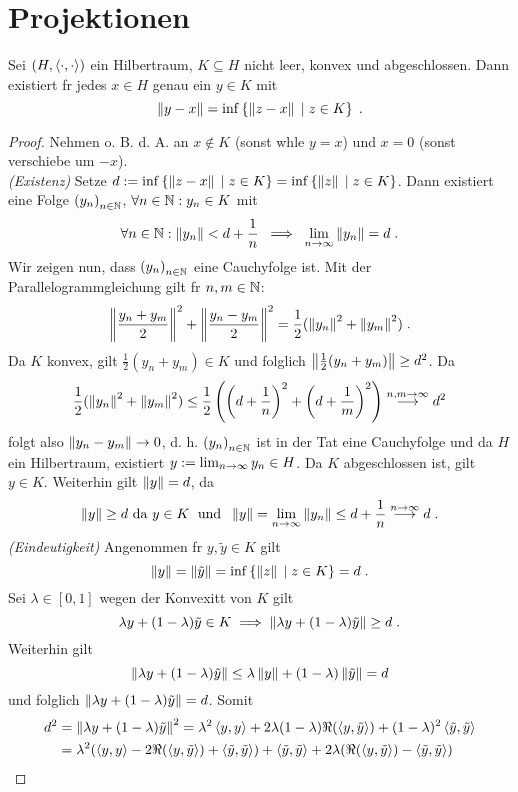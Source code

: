\section{Projektionen}
\begin{theorem}
	Sei \((H, \left\langle\cdot, \cdot\right\rangle)\) ein Hilbertraum, \(K \subseteq H\) nicht leer, konvex und abgeschlossen. Dann existiert f\us r jedes \(x \in H \) genau ein \(y \in K\) mit 
	\[\left\lVert y-x\right\rVert = \inf\left\{ \left\lVert z-x\right\rVert\;\vert\; z \in K\right\} \;.\]
	\label{Projektionssatz}
\end{theorem}
\begin{proof}
	Nehmen o. B. d. A. an \(x\not\in K\) (sonst w\as hle \(y = x\)) und \(x = 0\) (sonst verschiebe um \(-x\)).\\
	\textit{(Existenz)} Setze \(d:= \inf\left\{\left\lVert z-x\right\rVert \;\vert\; z\in K\right\} = \inf\left\{\left\lVert z\right\rVert\;\vert\; z\in K\right\} \). Dann existiert eine Folge \(\left (y_n\right )_{n\in \mathbb{N}}\), \(\forall n \in \mathbb{N}: y_n \in K\) mit
	\[\forall n \in \mathbb{N}: \left\lVert y_n\right\rVert < d + \frac{1}{n} \;\implies\; \lim_{n \to\infty} \left\lVert y_n\right\rVert = d\;.\]
	Wir zeigen nun, dass \(\left (y_n\right )_{n\in \mathbb{N}}\) eine Cauchyfolge ist. Mit der Parallelogrammgleichung gilt f\us r \(n,m\in\mathbb{N}\):
	\[\left\lVert\frac{y_n + y_m}{2}\right\rVert^2 + \left\lVert\frac{y_n - y_m}{2}\right\rVert^2 = \frac{1}{2} (\left\lVert y_n\right\rVert^2 + \left\lVert y_m\right\rVert^2)\;.\]
	Da \(K\) konvex, gilt \(\frac{1}{2}(y_n + y_m)\in K\) und folglich \(\left\lVert\frac{1}{2} (y_n + y_m)\right\rVert \geq d^2\). Da 
	\[\frac{1}{2} (\left\lVert y_n\right\rVert^2 + \left\lVert y_m\right\rVert^2) \leq \frac{1}{2}\left(\left(d+\frac{1}{n}\right)^2 + \left(d+\frac{1}{m}\right)^2\right) \overset{n,m\to \infty}{\longrightarrow} d^2 \]
	folgt also \(\left\lVert y_n - y_m\right\rVert\to 0\), d. h. \(\left (y_n\right )_{n\in \mathbb{N}}\) ist in der Tat eine Cauchyfolge und da $H$ ein Hilbertraum, existiert \(y:=\lim_{n \to \infty} y_n \in H\). Da $K$ abgeschlossen ist, gilt \(y\in K\). Weiterhin gilt \(\left\lVert y\right\rVert = d\), da
	\[\left\lVert y\right\rVert \geq d \text{ da } y\in K \;\text{ und }\; \left\lVert y\right\rVert = \lim_{n \to\infty} \left\lVert y_n\right\rVert \leq d+\frac{1}{n} \overset{n\to\infty}{\longrightarrow} d\;.\]
	\textit{(Eindeutigkeit)} Angenommen f\us r \(y, \tilde y \in K\) gilt
	\[\left\lVert y\right\rVert = \left\lVert\tilde y\right\rVert = \inf\left\{\left\lVert z\right\rVert \;\vert\; z \in K\right\} = d\;.\]
	Sei \(\lambda \in [0,1]\) wegen der Konvexit\as t von $K$ gilt 
	\[\lambda y + (1-\lambda) \tilde y \in K \implies \left\lVert\lambda y + (1-\lambda) \tilde y\right\rVert \geq d\;.\] 
	Weiterhin gilt 
	\[\left\lVert\lambda y + (1-\lambda) \tilde y\right\rVert \leq \lambda \left\lVert y\right\rVert + (1-\lambda) \left\lVert\tilde y\right\rVert = d \]
	und folglich \(\left\lVert\lambda y + (1-\lambda) \tilde y\right\rVert = d\). Somit 
	\begin{align*} 
	d^2 &= \norm{\lambda y + (1-\lambda) \tilde y}^2 = \lambda^2 \ip{y,y}  + 2\lambda (1-\lambda) \Re(\ip{y,\tilde y}) + (1-\lambda)^2 \ip{\tilde y, \tilde y} \\ &=\lambda^2(\ip{y,y} -2 \Re(\ip{y,\tilde y}) + \ip{\tilde y, \tilde y}) + \ip{\tilde y, \tilde y} + 2 \lambda(\Re(\ip{y,\tilde y})-\ip{\tilde y, \tilde y})\\ 

\end{align*}
\end{proof}
